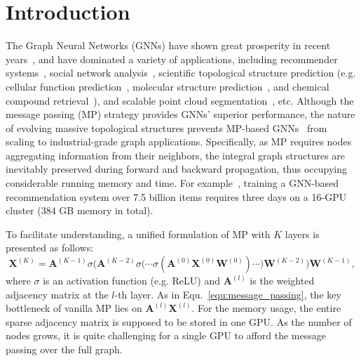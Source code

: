 \message{ !name(main.tex)}\documentclass{article}
\newcommand{\bm}[1]{\mathbf{#1}}
\begin{document}
\section{Introduction}
\vspace{-2mm}
The Graph Neural Networks (GNNs) have shown great prosperity in recent years~\citep{kipf2016semi,velickovic2017graph,hamilton2017inductive,xu2018powerful}, and have dominated a variety of applications, including recommender systems~\citep{he2020lightgcn,ying2018graph,zheng2021cold}, social network analysis~\citep{tang2009relational,gao2018large,huang2019graph}, scientific topological structure prediction (e.g. cellular function prediction~\citep{hu2020open,zitnik2017predicting}, molecular structure prediction~\citep{hu2019strategies,you2020graph}, and chemical compound retrieval~\citep{wale2008comparison}), and scalable point cloud segmentation~\citep{li2019deepgcns,wang2019dynamic}, etc. Although the message passing (MP) strategy provides GNNs' superior performance, the nature of evolving massive topological structures prevents MP-based GNNs~\citep{li2020deepergcn,klicpera2018predict,xu2018representation,kipf2016semi,velickovic2017graph,xu2018powerful,gao2019graph, zhou2019multi} from scaling to industrial-grade graph applications. Specifically, as MP requires nodes aggregating information from their neighbors, the integral graph structures are inevitably preserved during forward and backward propagation, thus occupying considerable running memory and time. For example~\citep{ying2018graph}, training a GNN-based recommendation system over 7.5 billion items requires three days on a 16-GPU cluster (384 GB memory in total).

To facilitate understanding, a unified formulation of MP with \(K\) layers is presented as follows:
\begin{equation}\label{equ:message_passing}
	\bm{X}^{(K)} = {\bm{A}}^{(K-1)}\sigma\bigg({\bm{A}}^{(K-2)}\sigma\big(\cdots \sigma({\bm{A}}^{(0)}\bm{X}^{(0)}\bm{W}^{(0)}) \cdots\big)\bm{W}^{(K-2)}\bigg)\bm{W}^{(K-1)},
\end{equation}
where \(\sigma\) is an activation function (e.g. ReLU) and \({\bm{A}}^{(l)}\) is the weighted adjacency matrix at the \(l\)-th layer. As in Equ.~\eqref{equ:message_passing}, the key bottleneck of vanilla MP lies on \({\bm{A}}^{(l)}\bm{X}^{(l)}\). For the memory usage, the entire sparse adjacency matrix is supposed to be stored in one GPU. As the number of nodes grows, it is quite challenging for a single GPU to afford the message passing over the full graph.
\end{document}
